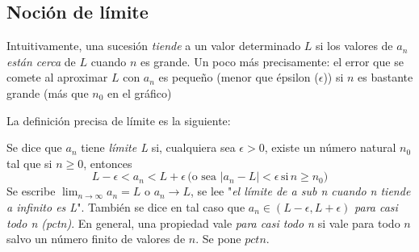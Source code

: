 \documentclass[../teoria.root.tex]{subfiles}
\begin{document}
\subsection{Noción de límite}
Intuitivamente, una sucesión \textit{tiende} a un valor determinado \(L\) si los valores de \(a_n\) \textit{están cerca} de \(L\) cuando \(n\) es grande.
Un poco más precisamente:
el error que se comete al aproximar \(L\) con \(a_n\) es pequeño (menor que épsilon (\(\epsilon\))) si \(n\) es bastante grande (más que \(n_0\) en el gráfico)
\begin{center}
    \begin{scaletikzpicturetowidth}{\linewidth}
    \end{scaletikzpicturetowidth}
\end{center}
La definición precisa de límite es la siguiente:

Se dice que \(a_n\) tiene \textit{límite L} si, cualquiera sea \(\epsilon>0\), existe un número natural \(n_0\) tal que si \(n\geq0\), entonces \[L-\epsilon<a_n<L+\epsilon\,\text{(o sea \(|a_n-L|<\epsilon\,\text{si}\,n\geq n_0\))}\]
Se escribe \(\lim_{n\to\infty}a_n=L\) o \(a_n\rightarrow L\), se lee "\textit{el límite de a sub n cuando n tiende a infinito es L}".
También se dice en tal caso que \(a_n\in(L-\epsilon,L+\epsilon)\) \textit{para casi todo n (pctn)}.
En general, una propiedad vale \textit{para casi todo n} si vale para todo \(n\) salvo un número finito de valores de \(n\).
Se pone \(pctn\).
\end{document}
